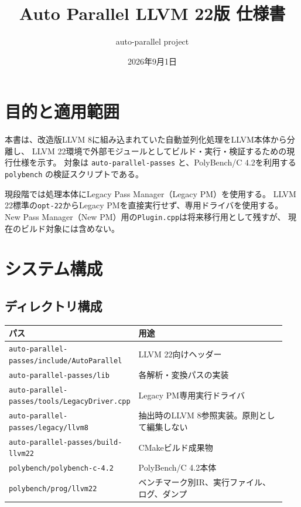 \documentclass[a4paper,11pt]{ltjsarticle}
\title{Auto Parallel LLVM 22版 仕様書}
\author{auto-parallel project}
\date{2026年9月1日}
\begin{document}
\maketitle
\tableofcontents
\newpage

\section{目的と適用範囲}
本書は、改造版LLVM 8に組み込まれていた自動並列化処理をLLVM本体から分離し、
LLVM 22環境で外部モジュールとしてビルド・実行・検証するための現行仕様を示す。
対象は \texttt{auto-parallel-passes} と、PolyBench/C 4.2を利用する
\texttt{polybench} の検証スクリプトである。

現段階では処理本体にLegacy Pass Manager（Legacy PM）を使用する。
LLVM 22標準の\texttt{opt-22}からLegacy PMを直接実行せず、専用ドライバを使用する。
New Pass Manager（New PM）用の\texttt{Plugin.cpp}は将来移行用として残すが、
現在のビルド対象には含めない。

\section{システム構成}
\subsection{ディレクトリ構成}
\begin{longtable}{p{0.37\linewidth}p{0.57\linewidth}}
\toprule
パス & 用途 \\
\midrule
\endhead
\texttt{auto-parallel-passes/include/AutoParallel} & LLVM 22向けヘッダー \\
\texttt{auto-parallel-passes/lib} & 各解析・変換パスの実装 \\
\texttt{auto-parallel-passes/tools/LegacyDriver.cpp} & Legacy PM専用実行ドライバ \\
\texttt{auto-parallel-passes/legacy/llvm8} & 抽出時のLLVM 8参照実装。原則として編集しない \\
\texttt{auto-parallel-passes/build-llvm22} & CMakeビルド成果物 \\
\texttt{polybench/polybench-c-4.2} & PolyBench/C 4.2本体 \\
\texttt{polybench/prog/llvm22} & ベンチマーク別IR、実行ファイル、ログ、ダンプ \\
\bottomrule
\end{longtable}
\end{document}
